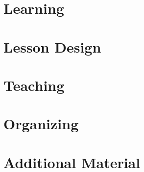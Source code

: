 \documentclass[10pt,statementpaper]{memoir}
\begin{document}




\part{Learning}





\part{Lesson Design}



\part{Teaching}






\part{Organizing}








\part{Additional Material}

\appendix














\end{document}

